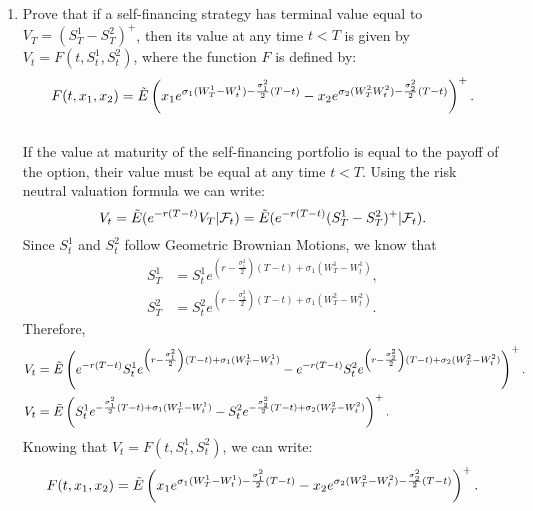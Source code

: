 \documentclass[11pt,a4,table]{article}
\begin{document}
\begin{enumerate}
\begin{enumerate}
        \item Prove that if a self-financing strategy has terminal value equal to $V_T=(S_T^1-S_T^2)^+$, then its value at any time $t<T$ is given by $V_t=F(t,S_t^1,S_t^2)$, where the function $F$ is defined by:
        \begin{equation}
            F(t,x_1,x_2) = \Tilde{E}\left(x_1e^{\sigma_1(W_T^1-W_t^1)-\frac{\sigma_1^2}{2}(T-t)}-x_2e^{\sigma_2(W_T^2W_t^2)-\frac{\sigma_2^2}{2}(T-t)}\right)^+.
        \end{equation}\\
        If the value at maturity of the self-financing portfolio is equal to the payoff of the option, their value must be equal at any time $t< T$. Using the risk neutral valuation formula we can write:
        \begin{equation*}
            V_t = \Tilde{E}(e^{-r(T-t)}V_T|\mathcal{F}_t) = \Tilde{E}(e^{-r(T-t)}(S_T^1 - S_T^2)^+|\mathcal{F}_t).
        \end{equation*}
        Since $S_t^1$ and $S_t^2$ follow Geometric Brownian Motions, we know that
        \begin{align*}
            S_T^1 &= S_t^1e^{\left(r - \frac{\sigma_1^2}{2}\right)(T-t) + \sigma_1(W_T^1-W_t^1)},\\
            S_T^2 &= S_t^2e^{\left(r - \frac{\sigma_2^2}{2}\right)(T-t) + \sigma_1(W_T^2-W_t^2)}.
        \end{align*}
        Therefore,
        \begin{align*}
            V_t &= \Tilde{E}\left(e^{-r(T-t)}S_t^1e^{\left(r-\frac{\sigma_1^2}{2}\right)(T-t)+\sigma_1(W_T^1-W_t^1)} - e^{-r(T-t)}S_t^2e^{\left(r - \frac{\sigma_2^2}{2}\right) (T-t) + \sigma_2(W_T^2-W_t^2)}\right)^+.\\
            V_t &= \Tilde{E}\left(S_t^1e^{-\frac{\sigma_1^2}{2}(T-t) + \sigma_1(W_T^1-W_t^1)}-S_t^2e^{-\frac{\sigma_2^2}{2}(T-t) + \sigma_2(W_T^2-W_t^2)}\right)^+.
        \end{align*}
        Knowing that $V_t=F(t,S_t^1,S_t^2)$, we can write:
        \begin{equation*}
            F(t,x_1,x_2) = \Tilde{E}\left(x_1e^{\sigma_1(W_T^1-W_t^1)-\frac{\sigma_1^2}{2}(T-t)} - x_2e^{\sigma_2(W_T^2-W_t^2)-\frac{\sigma_2^2}{2}(T-t)}\right)^+.
        \end{equation*}
        

\end{enumerate}
\end{enumerate}
\end{document}
